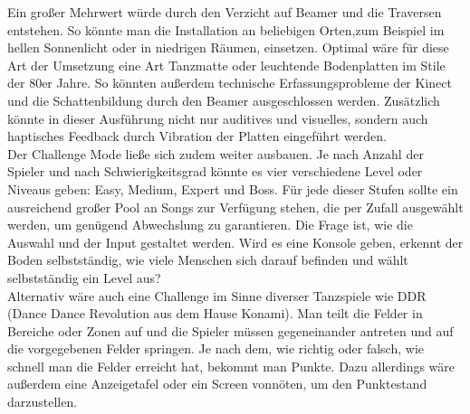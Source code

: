 
Ein großer Mehrwert würde durch den Verzicht auf Beamer und die Traversen entstehen. So könnte man die Installation an beliebigen Orten,zum Beispiel im hellen Sonnenlicht oder in niedrigen Räumen, einsetzen. Optimal wäre für diese Art der Umsetzung eine Art Tanzmatte oder leuchtende Bodenplatten im Stile der 80er Jahre. So könnten außerdem technische Erfassungsprobleme der Kinect und die Schattenbildung durch den Beamer ausgeschlossen werden. Zusätzlich könnte in dieser Ausführung nicht nur auditives und visuelles, sondern auch haptisches Feedback durch Vibration der Platten eingeführt werden.\\

Der Challenge Mode ließe sich zudem weiter ausbauen. Je nach Anzahl der Spieler und nach Schwierigkeitsgrad könnte es vier verschiedene Level oder Niveaus geben: Easy, Medium, Expert und Boss. Für jede dieser Stufen sollte ein ausreichend großer Pool an Songs zur Verfügung stehen, die per Zufall ausgewählt werden, um genügend Abwechslung zu garantieren. Die Frage ist, wie die Auswahl und der Input gestaltet werden. Wird es eine Konsole geben, erkennt der Boden selbstständig, wie viele Menschen sich darauf befinden und wählt selbstständig ein Level aus?\\

Alternativ wäre auch eine Challenge im Sinne diverser Tanzspiele wie DDR (Dance Dance Revolution aus dem Hause Konami). Man teilt die Felder in Bereiche oder Zonen auf und die Spieler müssen gegeneinander antreten und auf die vorgegebenen Felder springen. Je nach dem, wie richtig oder falsch, wie schnell man die Felder erreicht hat, bekommt man Punkte. Dazu allerdings wäre außerdem eine Anzeigetafel oder ein Screen vonnöten, um den Punktestand darzustellen.